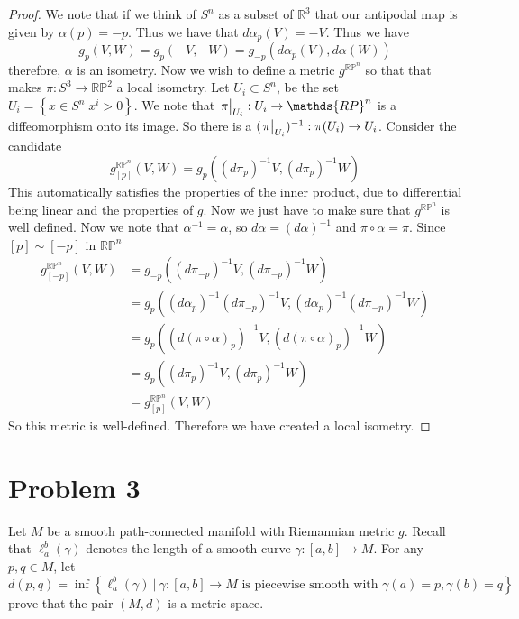 \documentclass[a4paper]{article}
\begin{document}
\begin{proof}
  We note that if we think of $S^n$ as a subset of $\mathds{R}^3$ that our antipodal map is given by $\alpha(p) = -p$. Thus we have that $d\alpha_p(V) = -V$. Thus we have 
  \[
    g_p(V,W) = g_p(-V,-W) = g_{-p}(d\alpha_p(V), d\alpha(W))
  \]
  therefore, $\alpha$ is an isometry. Now we wish to define a metric $g^{\mathds{RP}^n}$ so that that makes $\pi: S^3 \rightarrow \mathds{RP}^2$ a local isometry. Let $U_i \subset S^n$, be the set $ U_i = \left\{ x \in S^n | x^i > 0 \right\}$. We note that $\eval{\pi}_{U_i}: U_i \rightarrow \mathds{RP}^n$ is a diffeomorphism onto its image. So there is a $(\eval{\pi}_{U_i})^{-1}: \pi(U_i) \rightarrow U_i$. Consider the candidate 
  \[
    g^{\mathds{RP}^n}_{[p]}(V,W) = g_p\left(\left(d\pi_p\right)^{-1} V, \left(d\pi_p\right)^{-1} W  \right)
  \]
  This automatically satisfies the properties of the inner product, due to differential being linear and the properties of $g$. Now we just have to make sure that $g^{\mathds{RP}^n}$ is well defined. Now we note that $\alpha^{-1} = \alpha$, so $d\alpha = (d\alpha)^{-1}$ and $\pi \circ \alpha = \pi$. Since $[p] \sim [-p]$ in $\mathds{RP}^n$
  \[
    \begin{aligned}
      g_{[-p]}^{\mathds{RP}^n}(V,W) &= g_{-p}\left(\left(d\pi_{-p}\right)^{-1} V, \left(d\pi_{-p}\right)^{-1} W  \right) \\
                                    &= g_{p}\left((d\alpha_p)^{-1}\left(d\pi_{-p}\right)^{-1} V, (d\alpha_p)^{-1}\left(d\pi_{-p}\right)^{-1} W  \right) \\
                                    &= g_{p}\left(\left(d(\pi \circ \alpha)_{p}\right)^{-1} V, \left(d(\pi \circ \alpha)_{p}\right)^{-1} W \right) \\
                                    &= g_{p} \left( (d\pi_p)^{-1}V, (d\pi_p)^{-1}W \right) \\
                                    &= g_{[p]}^{\mathds{RP}^n}(V,W)
    \end{aligned}
  \]
  So this metric is well-defined. Therefore we have created a local isometry.
\end{proof}

\section*{Problem 3}%
Let $M$ be a smooth path-connected manifold with Riemannian metric $g$. Recall that $\ell_a^b(\gamma)$ denotes the length of a smooth curve $\gamma: [a,b] \rightarrow M$. For any $p,q \in M$, let
\[
  d(p,q) = \inf \left\{ \ell_a^b(\gamma)\ |\ \gamma:[a,b] \rightarrow M \text{ is piecewise smooth with } \gamma(a)=p, \gamma(b) = q \right\}
\]
prove that the pair $(M,d)$ is a metric space.
\end{document}
